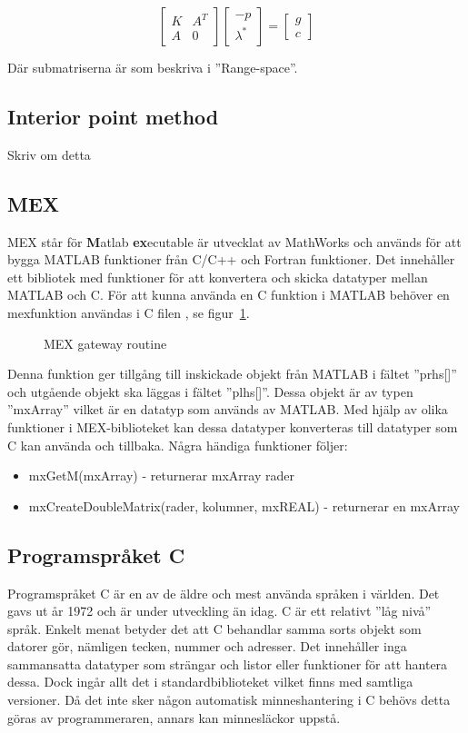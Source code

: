 $$\begin{bmatrix}
K & A^T \\
A & 0
\end{bmatrix}
\begin{bmatrix}
-p \\
\lambda^*
\end{bmatrix}
=
\begin{bmatrix}
g \\
c
\end{bmatrix}
$$

Där submatriserna är som beskriva i ''Range-space''\citep{numericaloptimization}.

\subsection{Interior point method}
Skriv om detta

\subsection{MEX}
\label{sec:mex}
MEX står för \textbf{M}atlab \textbf{ex}ecutable är utvecklat av MathWorks och används för att bygga MATLAB funktioner från C/C++ och Fortran funktioner. Det innehåller ett bibliotek med funktioner för att konvertera och skicka datatyper mellan MATLAB och C. För att kunna använda en C funktion i MATLAB behöver en mexfunktion användas i C filen \citep{mathworks}, se figur~\ref{fig:mex}. 

\begin{figure}[H]

\caption{MEX gateway routine}
\label{fig:mex}
\end{figure}  

Denna funktion ger tillgång till inskickade objekt från MATLAB i fältet ''prhs[]'' och utgående objekt ska läggas i fältet ''plhs[]''. Dessa objekt är av typen ''mxArray'' vilket är en datatyp som används av MATLAB. Med hjälp av olika funktioner i MEX-biblioteket kan dessa datatyper konverteras till datatyper som C kan använda och tillbaka\citep{mathworks}. Några händiga funktioner följer:
\begin{itemize}
\item mxGetM(mxArray) - returnerar mxArray rader
\item mxCreateDoubleMatrix(rader, kolumner, mxREAL) - returnerar en mxArray
\end{itemize}

\subsection{Programspråket C}
Programspråket C är en av de äldre och mest använda språken i världen. Det gavs ut år 1972 och är under utveckling än idag. C är ett relativt ''låg nivå'' språk. Enkelt menat betyder det att C behandlar samma sorts objekt som datorer gör, nämligen tecken, nummer och adresser. Det innehåller inga sammansatta datatyper som strängar och listor eller funktioner för att hantera dessa. Dock ingår allt det i standardbiblioteket vilket finns med samtliga versioner. Då det inte sker någon automatisk minneshantering i C behövs detta göras av programmeraren, annars kan minnesläckor uppstå. \citep{cbible}
